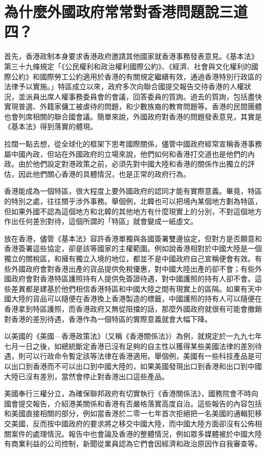 \section{為什麼外國政府常常對香港問題說三道四？}

首先，香港政制本身要求香港政府邀請其他國家就香港事務發表意見。《基本法》第三十九條規定「《公民權利和政治權利國際公約》、《經濟、社會與文化權利的國際公約》和國際勞工公約適用於香港的有關規定繼續有效，通過香港特別行政區的法律予以實施。」特區成立以來，政府多次向聯合國提交報告交待香港的人權狀況，並派員出席人權事務委員會的會議，回答委員的質詢。過去的質詢，包括盡快實現普選、外籍家傭工被虐待的問題，和少數族裔的教育問題等。香港的民間團體也會列席相關的聯合國會議。簡單來說，外國政府對香港的問題發表意見，其實是《基本法》得到落實的體現。

拉闊一點去想，從全球化的框架下思考國際關係，儘管中國政府經常宣稱香港事務屬中國內政，但站在外國政府的立場來說，他們如何和香港打交道也是他們的內政。由於他們設定對港政策之前，必須先對中國大陸和香港的關係作出獨立的評估，因此他們關心香港的具體情況，也是正常的政府行為。

香港能成為一個特區，很大程度上要外國政府的認同才能有實際意義。畢竟，特區的特別之處，往往關乎涉外事務。舉個例，北韓也可以把境內某個地方劃為特區，但如果外國不認為這個地方和北韓的其他地方有什麼現實上的分別，不對這個地方作出任何差別對待，這個所謂的「特區」就會變成一紙虛文。

放在香港，儘管《基本法》容許香港單獨與各國簽署雙邊協定，但對方是否願意和香港簽署這些協定，卻是該等國家的主權範圍。例如說香港相對於中國大陸是一個獨立的關稅區，和擁有獨立入境的地位，都並不是中國政府自己宣稱便會有效。有些外國政府會對香港出產的貨品提供免稅優惠，對中國大陸出產的卻不會；有些外國政府會對香港特區護照持有人提供免簽證待遇，對中國護照的持有人卻不會。這些差異都是建基於他們相信香港特區和中國大陸之間有現實上的區隔。如果有天中國大陸的貨品可以隨便在香港換上香港製造的標籤，中國護照的持有人可以隨便在香港拿到特區護照，而香港政府又無從阻擋的話，那麼外國政府就很有可能會撤銷對香港的差別待遇，香港作為一個特區的實際意義就會大幅下降。

以美國的《美國—香港政策法》（又稱《香港關係法》）為例，就規定於一九九七年七月一日之後，如總統斷定香港已沒有足夠的自主性以獲得某些美國法律的差別待遇，則可以行政命令暫定該等法律在香港適用。舉個例，美國有一些科技產品是可以出口到香港而不可以出口到中國大陸的，如果美國發現出口到香港和出口到中國大陸已沒有差別，當然會停止對香港出口這些產品。

美國奉行三權分立，為確保聯邦政府有切實執行《香港關係法》，國務院會不時向國會提交報告，介紹港美關係和香港有否嚴格落實高度自治。這些報告的內容包括和美國直接相關的部分，例如當香港於二零一七年首次拒絕把一名美國的通輯犯移交美國，反而按中國政府的要求將之移交中國大陸，而中國大陸方面卻沒有公佈相關案件的處理情況。報告中也會論及香港的整體情況，例如眾多媒體被於中國大陸有商業利益的公司控制，新聞從業員認為它們會因經濟和政治原因作自我審查等。

